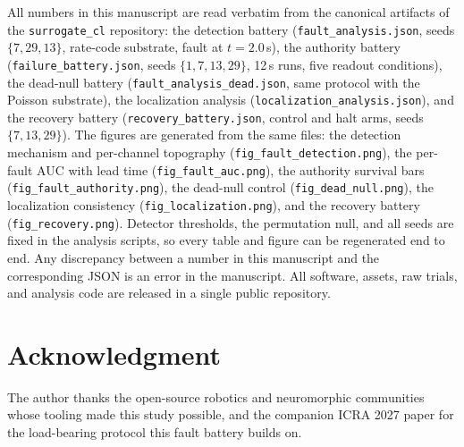 All numbers in this manuscript are read verbatim from the canonical artifacts
of the \texttt{surrogate\_cl} repository: the detection battery
(\texttt{fault\_analysis.json}, seeds $\{7, 29, 13\}$, rate-code substrate,
fault at $t = 2.0$\,s), the authority battery
(\texttt{failure\_battery.json}, seeds $\{1, 7, 13, 29\}$, 12\,s runs, five
readout conditions), the dead-null battery
(\texttt{fault\_analysis\_dead.json}, same protocol with the Poisson
substrate), the localization analysis (\texttt{localization\_analysis.json}),
and the recovery battery (\texttt{recovery\_battery.json}, control and halt
arms, seeds $\{7, 13, 29\}$). The figures are generated from the same files:
the detection mechanism and per-channel topography
(\texttt{fig\_fault\_detection.png}), the per-fault AUC with lead time
(\texttt{fig\_fault\_auc.png}), the authority survival bars
(\texttt{fig\_fault\_authority.png}), the dead-null control
(\texttt{fig\_dead\_null.png}), the localization consistency
(\texttt{fig\_localization.png}), and the recovery battery
(\texttt{fig\_recovery.png}). Detector thresholds, the permutation null,
and all seeds are fixed in the analysis scripts, so every table and figure can
be regenerated end to end. Any discrepancy between a number in this manuscript
and the corresponding JSON is an error in the manuscript. All software, assets,
raw trials, and analysis code are released in a single public repository.

\section*{Acknowledgment}

The author thanks the open-source robotics and neuromorphic communities whose
tooling made this study possible, and the companion ICRA 2027 paper for the
load-bearing protocol this fault battery builds on.

